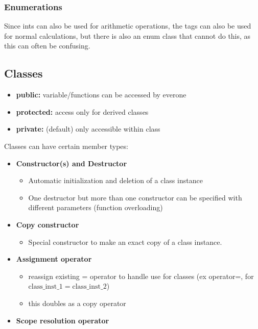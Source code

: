 \subsubsection{Enumerations}




Since ints can also be used for arithmetic operations, the tags can also be used for normal calculations, but there is also an enum class that cannot do this, as this can often be confusing.

\subsection{Classes}


\begin{itemize}
    \item \textbf{public:} variable/functions can be accessed by everone
    \item \textbf{protected:} access only for derived classes
    \item \textbf{private:} (default) only accessible within class
\end{itemize}

Classes can have certain member types:

\begin{itemize}
    \item \textbf{Constructor(s) and Destructor}
    \begin{itemize}
        \item Automatic initialization and deletion of a class instance
        \item One destructor but more than one constructor can be specified with different parameters (function overloading)
    \end{itemize}
    \item \textbf{Copy constructor}
    \begin{itemize}
        \item Special constructor to make an exact copy of a class instance.
    \end{itemize}
    \item \textbf{Assignment operator}
    \begin{itemize}
        \item reassign existing = operator to handle use for classes (ex operator=, for $\mathrm{class\_inst\_1 = class\_inst\_2}$)
        \item this doubles as a copy operator
    \end{itemize}
    \item \textbf{Scope resolution operator}
\end{itemize}

